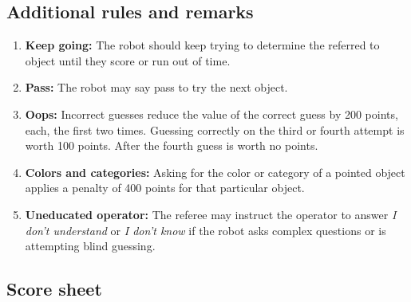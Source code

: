 %
%
\subsection{Additional rules and remarks}
\begin{enumerate}
	\item \textbf{Keep going:} The robot should keep trying to determine the referred to object until they score or run out of time.
	\item \textbf{Pass:} The robot may say pass to try the next object.
	\item \textbf{Oops:} Incorrect guesses reduce the value of the correct guess by 200 points, each, the first two times. Guessing correctly on the third or fourth attempt is worth 100 points. After the fourth guess is worth no points.
\item\textbf{Colors and categories:} Asking for the color or category of a pointed object applies a penalty of 400 points for that particular object.
\item\textbf{Uneducated operator:} The referee may instruct the operator to answer \emph{I don't understand} or \emph{I don't know} if the robot asks complex questions or is attempting blind guessing.

\end{enumerate}
\newpage
\subsection{Score sheet}


